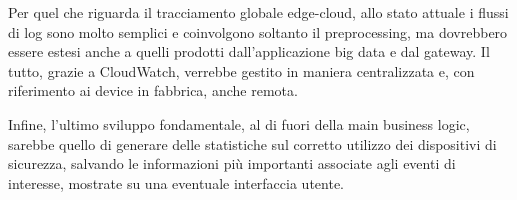 Per quel che riguarda il tracciamento globale edge-cloud, allo stato attuale i flussi di log sono molto semplici e coinvolgono soltanto il preprocessing, ma dovrebbero essere estesi anche a quelli prodotti dall'applicazione big data e dal gateway. Il tutto, grazie a CloudWatch, verrebbe gestito in maniera centralizzata e, con riferimento ai device in fabbrica, anche remota. 

Infine, l'ultimo sviluppo fondamentale, al di fuori della main business logic, sarebbe quello di generare delle statistiche sul corretto utilizzo dei dispositivi di sicurezza, salvando le informazioni più importanti associate agli eventi di interesse, mostrate su una eventuale interfaccia utente.
